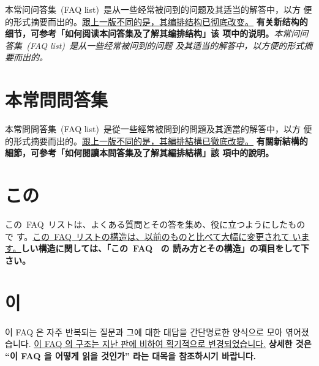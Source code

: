 \documentclass[12pt]{article}
\begin{document}
\begin{CJK*}{UTF8}{song}
本常问问答集~(FAQ list)~是从一些经常被问到的问题及其适当的解答中，以方
便的形式摘要而出的。\uline{跟上一版不同的是，其编排结构已彻底改变。}
\textbf{有关新结构的细节，可参考「如何阅读本问答集及了解其编排结构」该
  项中的说明。}\textit{本常问问答集~(FAQ list)~是从一些经常被问到的问题
  及其适当的解答中，以方便的形式摘要而出的。}


\section{本常問問答集}

本常問問答集~(FAQ list)~是從一些經常被問到的問題及其適當的解答中，以方
便的形式摘要而出的。\uline{跟上一版不同的是，其編排結構已徹底改變。}
\textbf{有關新結構的細節，可參考「如何閱讀本問答集及了解其編排結構」該
  項中的說明。}


\section{この}

この~FAQ~リストは、よくある質問とその答を集め、役に立つようにしたもので
す。\uline{この~FAQ~リストの構造は、以前のものと比べて大幅に変更されて
  います。}\textbf{しい構造に関しては、「この~FAQ~ の
  読み方とその構造」の項目をして下さい。}


\CJKspace
{}
\section{이}

이 FAQ 은 자주 반복되는 질문과 그에 대한 대답을 간단명료한 양식으로
모아 엮어졌습니다. \uline{이 FAQ 의 구조는 지난 판에 비하여 획기적으로
  변경되었습니다.}  \textbf{상세한 것은 “이 FAQ 을 어떻게 읽을
  것인가” 라는 대목을 참조하시기 바랍니다.}

\end{CJK*}
\end{document}
